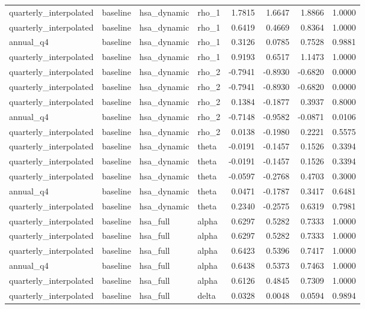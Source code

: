 \begin{tabular}{llllrrrr}
quarterly\_interpolated & baseline & hsa\_dynamic & rho\_1 & 1.7815 & 1.6647 & 1.8866 & 1.0000 \\
quarterly\_interpolated & baseline & hsa\_dynamic & rho\_1 & 0.6419 & 0.4669 & 0.8364 & 1.0000 \\
annual\_q4 & baseline & hsa\_dynamic & rho\_1 & 0.3126 & 0.0785 & 0.7528 & 0.9881 \\
quarterly\_interpolated & baseline & hsa\_dynamic & rho\_1 & 0.9193 & 0.6517 & 1.1473 & 1.0000 \\
quarterly\_interpolated & baseline & hsa\_dynamic & rho\_2 & -0.7941 & -0.8930 & -0.6820 & 0.0000 \\
quarterly\_interpolated & baseline & hsa\_dynamic & rho\_2 & -0.7941 & -0.8930 & -0.6820 & 0.0000 \\
quarterly\_interpolated & baseline & hsa\_dynamic & rho\_2 & 0.1384 & -0.1877 & 0.3937 & 0.8000 \\
annual\_q4 & baseline & hsa\_dynamic & rho\_2 & -0.7148 & -0.9582 & -0.0871 & 0.0106 \\
quarterly\_interpolated & baseline & hsa\_dynamic & rho\_2 & 0.0138 & -0.1980 & 0.2221 & 0.5575 \\
quarterly\_interpolated & baseline & hsa\_dynamic & theta & -0.0191 & -0.1457 & 0.1526 & 0.3394 \\
quarterly\_interpolated & baseline & hsa\_dynamic & theta & -0.0191 & -0.1457 & 0.1526 & 0.3394 \\
quarterly\_interpolated & baseline & hsa\_dynamic & theta & -0.0597 & -0.2768 & 0.4703 & 0.3000 \\
annual\_q4 & baseline & hsa\_dynamic & theta & 0.0471 & -0.1787 & 0.3417 & 0.6481 \\
quarterly\_interpolated & baseline & hsa\_dynamic & theta & 0.2340 & -0.2575 & 0.6319 & 0.7981 \\
quarterly\_interpolated & baseline & hsa\_full & alpha & 0.6297 & 0.5282 & 0.7333 & 1.0000 \\
quarterly\_interpolated & baseline & hsa\_full & alpha & 0.6297 & 0.5282 & 0.7333 & 1.0000 \\
quarterly\_interpolated & baseline & hsa\_full & alpha & 0.6423 & 0.5396 & 0.7417 & 1.0000 \\
annual\_q4 & baseline & hsa\_full & alpha & 0.6438 & 0.5373 & 0.7463 & 1.0000 \\
quarterly\_interpolated & baseline & hsa\_full & alpha & 0.6126 & 0.4845 & 0.7309 & 1.0000 \\
quarterly\_interpolated & baseline & hsa\_full & delta & 0.0328 & 0.0048 & 0.0594 & 0.9894 \\

\end{tabular}
